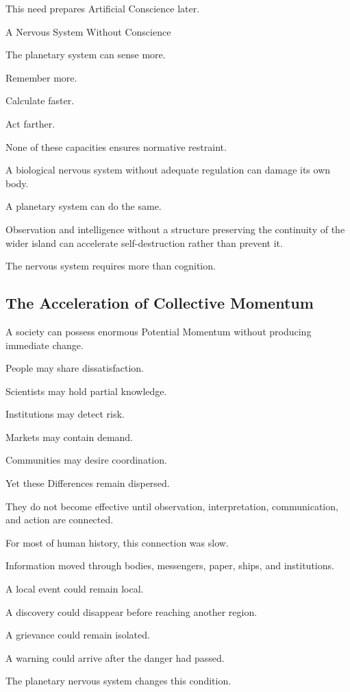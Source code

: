 This need prepares Artificial Conscience later.

A Nervous System Without Conscience

The planetary system can sense more.

Remember more.

Calculate faster.

Act farther.

None of these capacities ensures normative restraint.

A biological nervous system without adequate regulation can damage its own body.

A planetary system can do the same.

Observation and intelligence without a structure preserving the continuity of the wider island can accelerate self-destruction rather than prevent it.

The nervous system requires more than cognition.

\subsection*{\textbf{The Acceleration of Collective Momentum}} 

A society can possess enormous Potential Momentum without producing immediate change.

People may share dissatisfaction.

Scientists may hold partial knowledge.

Institutions may detect risk.

Markets may contain demand.

Communities may desire coordination.

Yet these Differences remain dispersed.

They do not become effective until observation, interpretation, communication, and action are connected.

For most of human history, this connection was slow.

Information moved through bodies, messengers, paper, ships, and institutions.

A local event could remain local.

A discovery could disappear before reaching another region.

A grievance could remain isolated.

A warning could arrive after the danger had passed.

The planetary nervous system changes this condition.

